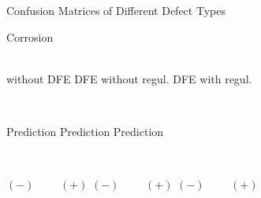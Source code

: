 \documentclass{bredelebeamerKareem}
\begin{document}
\begin{frame}{Confusion Matrices of Different Defect Types}
\hfill\begin{minipage}{0.15\linewidth}
\vspace{3em}
Corrosion\\[6em]
\\[6em]
\end{minipage}%
\begin{minipage}{0.85\linewidth}
\begin{minipage}{\linewidth}
\hspace{6.5em} without DFE \hspace{6em} DFE without regul. \hspace{5em} DFE with regul.
\end{minipage}\\[1em]
\begin{minipage}{\linewidth}
\hspace{7em} Prediction \hspace{8.5em} Prediction \hspace{8em}Prediction
\end{minipage}\\
\begin{minipage}{\linewidth}
\hspace{6.5em} $(-)\,\,\qquad(+)$ \hspace{7em} $(-)\,\,\qquad(+)$ \hspace{7em}$(-)\,\,\qquad(+)$
\end{minipage}\\
\begin{minipage}{\linewidth}
\begin{table}
\centering

\hfill
{}\hfill
{}

\vspace{1em}


\vspace{1em}

\end{table}
\end{minipage}
\end{minipage}
\end{frame}
\end{document}
